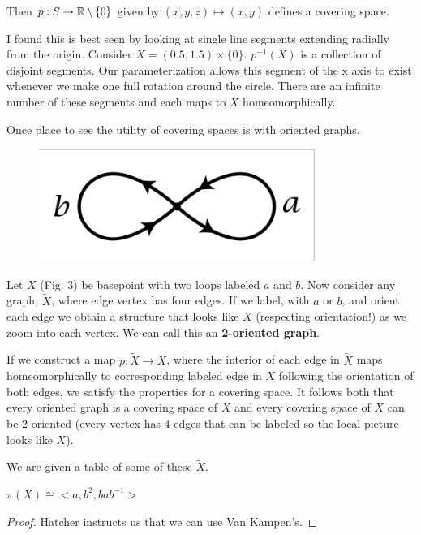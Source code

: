 \documentclass[10pt]{article}
\begin{document}
Then $p: S \to \mathbb{R} \setminus \{0\}$ given by $(x, y, z) \mapsto (x, y)$ defines a
covering space.

I found this is best seen by looking at single line segments extending radially
from the origin. Consider $X = (0.5, 1.5) \times \{0\}$. $p^{-1}(X)$ is a
collection of disjoint segments. Our parameterization allows this segment of
the x axis to exist whenever we make one full rotation around the circle. There
are an infinite number of these segments and each maps to $X$ homeomorphically.

Once place to see the utility of covering spaces is with oriented graphs.

\begin{figure}[ht!]
\centering
\includegraphics[width=90mm]{./2-oriented.png}
\caption{}
\end{figure}


Let $X$ (Fig. 3) be basepoint with two loops labeled $a$ and $b$. Now consider any
graph, $\tilde{X}$, where edge vertex has four edges. If we label, with $a$ or
$b$, and orient each edge we obtain a structure that looks like $X$ (respecting
orientation!) as we zoom into each vertex. We can call this an \textbf{2-oriented graph}.

If we construct a map $p: \tilde{X} \to X$, where the interior of each edge in 
$\tilde{X}$ maps homeomorphically to corresponding labeled edge in $X$
following the orientation of both edges, we satisfy the properties for a covering
space. It follows both that every oriented graph is a covering space of $X$ and
every covering space of $X$ can be 2-oriented (every vertex has 4 edges that
can be labeled so the local picture looks like $X$).

We are given a table of some of these $\tilde{X}$.

\begin{theorem}
	$\pi(X) \cong < a, b^2, bab^{-1} >$
\end{theorem}

\begin{proof}
Hatcher instructs us that we can use Van Kampen's.

\end{proof}
\end{document}
